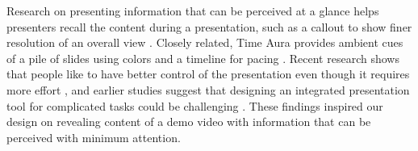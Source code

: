 Research on presenting information that can be perceived at a glance \cite{Matthews:2006:DEG:1142405.1142457} helps presenters recall the content during a presentation, such as a callout to show finer resolution of an overall view \cite{Baudisch:2002:KTC:503376.503423}. Closely related, Time Aura provides ambient cues of a pile of slides using colors and a timeline for pacing \cite{Mamykina:2001:TAI:365024.365077}. Recent research shows that people like to have better control of the presentation even though it requires more effort \cite{Lee:2013:STM:2553699.2553755}, and earlier studies suggest that designing an integrated presentation tool for complicated tasks could be challenging \cite{Johnson:1996:CPS:226159.226161}. These findings inspired our design on revealing content of a demo video with information that can be perceived with minimum attention.
